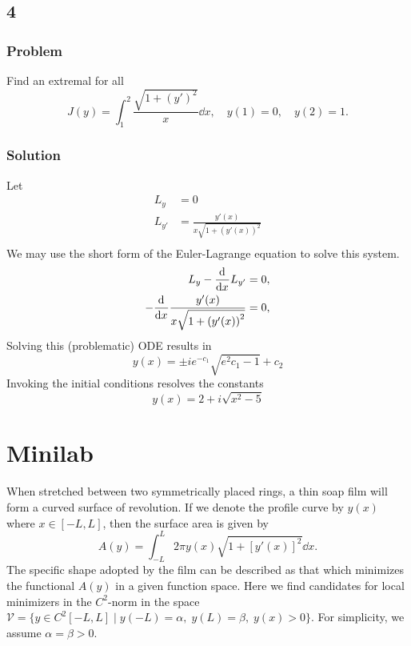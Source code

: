 \documentclass[12pt,twoside]{article}
\begin{document}
\subsection{4}
\subsubsection*{Problem}
Find an extremal for all
\begin{equation}
  \label{eq:4.3.4-problem}
  J(y) = \int_1^2\frac{\sqrt{1+{(y')}^2}}{x}\dd{x},\quad y(1)=0,\quad y(2)=1.
\end{equation}
\subsubsection*{Solution}
Let
\begin{align*}
  L_y &= 0 \\
  L_{y'} &= \frac{y'(x)}{x\sqrt{1+{(y'(x))}^2}} \\
\end{align*}
We may use the short form of the Euler-Lagrange equation to solve this system.
\begin{align*}
  L_y - \frac{\mathrm{d}^{} {}}{\mathrm{d}{x}^{}} L_{y'} &= 0, \\
  -\frac{\mathrm{d}^{} {}}{\mathrm{d}{x}^{}}\frac{y'(x)}{x\sqrt{1+{(y'(x))}^2}} &= 0, \\
\end{align*}
Solving this (problematic) ODE results in
\begin{equation*}
  y(x) = \pm i e^{-c_1}\sqrt{e^2c_1-1}+c_2
\end{equation*}
Invoking the initial conditions resolves the constants
\begin{equation*}
  \boxed{y(x) = 2+i \sqrt{x^2-5}}
\end{equation*}
\section{Minilab}
When stretched between two symmetrically placed rings, a thin soap film will
form a curved surface of revolution. If we denote the profile curve by $y(x)$
where $x\in[-L,L]$, then the surface area is given by
\begin{equation}
  \label{eq:minilab-surface-area}
  A(y)=\int_{-L}^L 2\pi y(x) \sqrt{1 + {\left[ y'(x) \right]}^2}\dd{x}.
\end{equation}
The specific shape adopted by the film can be described as that which minimizes
the functional $A(y)$ in a given function space. Here we find candidates for
local minimizers in the $C^2$-norm in the space $\mathcal{V}=\{y\in
C^2[-L,L]\;|\;y(-L)=\alpha,\;y(L)=\beta,\;y(x)>0\}$. For simplicity, we assume
$\alpha=\beta>0$.
\end{document}
